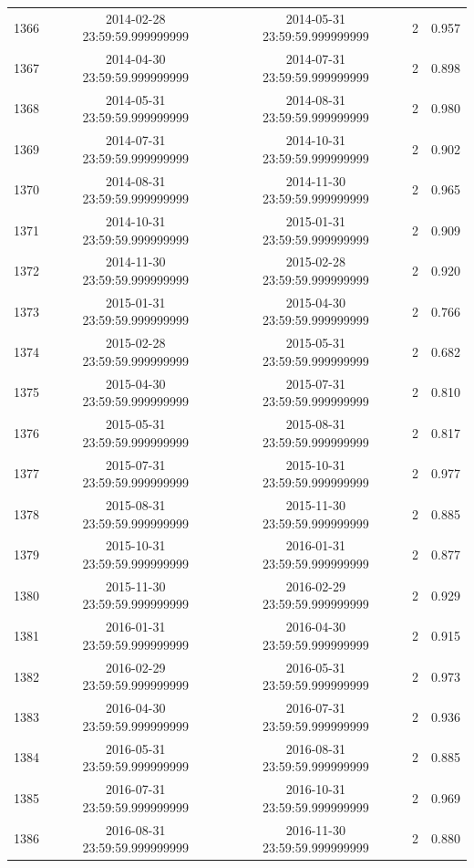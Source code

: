 \begin{table}
\begin{tabular}{lcccc}
1366 & 2014-02-28 23:59:59.999999999 & 2014-05-31 23:59:59.999999999 & 2 & 0.957 \\
1367 & 2014-04-30 23:59:59.999999999 & 2014-07-31 23:59:59.999999999 & 2 & 0.898 \\
1368 & 2014-05-31 23:59:59.999999999 & 2014-08-31 23:59:59.999999999 & 2 & 0.980 \\
1369 & 2014-07-31 23:59:59.999999999 & 2014-10-31 23:59:59.999999999 & 2 & 0.902 \\
1370 & 2014-08-31 23:59:59.999999999 & 2014-11-30 23:59:59.999999999 & 2 & 0.965 \\
1371 & 2014-10-31 23:59:59.999999999 & 2015-01-31 23:59:59.999999999 & 2 & 0.909 \\
1372 & 2014-11-30 23:59:59.999999999 & 2015-02-28 23:59:59.999999999 & 2 & 0.920 \\
1373 & 2015-01-31 23:59:59.999999999 & 2015-04-30 23:59:59.999999999 & 2 & 0.766 \\
1374 & 2015-02-28 23:59:59.999999999 & 2015-05-31 23:59:59.999999999 & 2 & 0.682 \\
1375 & 2015-04-30 23:59:59.999999999 & 2015-07-31 23:59:59.999999999 & 2 & 0.810 \\
1376 & 2015-05-31 23:59:59.999999999 & 2015-08-31 23:59:59.999999999 & 2 & 0.817 \\
1377 & 2015-07-31 23:59:59.999999999 & 2015-10-31 23:59:59.999999999 & 2 & 0.977 \\
1378 & 2015-08-31 23:59:59.999999999 & 2015-11-30 23:59:59.999999999 & 2 & 0.885 \\
1379 & 2015-10-31 23:59:59.999999999 & 2016-01-31 23:59:59.999999999 & 2 & 0.877 \\
1380 & 2015-11-30 23:59:59.999999999 & 2016-02-29 23:59:59.999999999 & 2 & 0.929 \\
1381 & 2016-01-31 23:59:59.999999999 & 2016-04-30 23:59:59.999999999 & 2 & 0.915 \\
1382 & 2016-02-29 23:59:59.999999999 & 2016-05-31 23:59:59.999999999 & 2 & 0.973 \\
1383 & 2016-04-30 23:59:59.999999999 & 2016-07-31 23:59:59.999999999 & 2 & 0.936 \\
1384 & 2016-05-31 23:59:59.999999999 & 2016-08-31 23:59:59.999999999 & 2 & 0.885 \\
1385 & 2016-07-31 23:59:59.999999999 & 2016-10-31 23:59:59.999999999 & 2 & 0.969 \\
1386 & 2016-08-31 23:59:59.999999999 & 2016-11-30 23:59:59.999999999 & 2 & 0.880 \\

\end{tabular}
\end{table}
